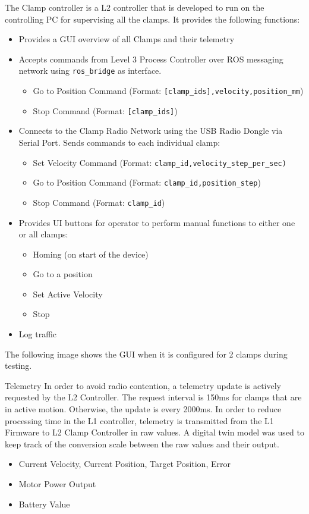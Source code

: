 The Clamp controller is a L2 controller that is developed to run on the controlling PC for supervising all the clamps. It provides the following functions:
\begin{itemize}
    \item Provides a GUI overview of all Clamps and their telemetry
    \item Accepts commands from Level 3 Process Controller over ROS messaging network using \verb|ros_bridge| as interface.
    \begin{itemize}
        \item Go to Position Command (Format: \verb|[clamp_ids],velocity,position_mm|)
        \item Stop Command (Format: \verb|[clamp_ids]|)
    \end{itemize}
    \item Connects to the Clamp Radio Network using the USB Radio Dongle via Serial Port. Sends commands to each individual clamp:
    \begin{itemize}
        \item Set Velocity Command (Format: \verb|clamp_id,velocity_step_per_sec)|
        \item Go to Position Command (Format: \verb|clamp_id,position_step|)
        \item Stop Command (Format: \verb|clamp_id|)
    \end{itemize}
    \item Provides UI buttons for operator to perform manual functions to either one or all clamps:
    \begin{itemize}
        \item Homing (on start of the device)
        \item Go to a position
        \item Set Active Velocity
        \item Stop
    \end{itemize}
    \item Log traffic
\end{itemize}

The following image shows the GUI when it is configured for 2 clamps during testing. 

Telemetry 
In order to avoid radio contention, a telemetry update is actively requested by the L2 Controller. The request interval is 150ms for clamps that are in active motion. Otherwise, the update is every 2000ms. 
In order to reduce processing time in the L1 controller, telemetry is transmitted from the L1 Firmware to L2 Clamp Controller in raw values. A digital twin model was used to keep track of the conversion scale between the raw values and their output.
\begin{itemize}
    \item Current Velocity, Current Position, Target Position, Error
    \item Motor Power Output
    \item Battery Value 
\end{itemize}

